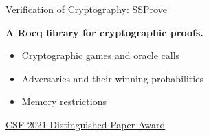 \begin{frame}{Verification of Cryptography: SSProve}
  \vspace{0.4em}
  {\Large\bfseries A Rocq library for cryptographic proofs.\par}
  \vspace{1.0em}
  \begin{itemize}
    \item Cryptographic games and oracle calls
    \item Adversaries and their winning probabilities
    \item Memory restrictions
  \end{itemize}
  \vspace{1.0em}
  {\small\color{MendingGold}
    \href{https://www.ieee-security.org/CSFWweb/distinguished.html}
      {CSF 2021 Distinguished Paper Award}\par}
\end{frame}
